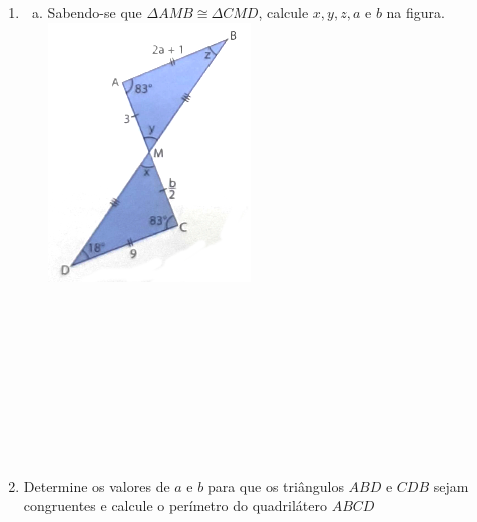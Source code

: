 \documentclass[a4paper,14pt]{article}
\begin{document}
\begin{multicols}{2}
\begin{enumerate}
			\item \begin{enumerate}[a)]
				\item Sabendo-se que $\Delta$$AMB \cong \Delta$$CMD$, calcule $x, y, z, a$ e $b$ na figura. \\
				\includegraphics[width=1.1\linewidth]{6FMA109_imagens/imagem5} \\\\\\\\\\\\\\\\\\\\
			\end{enumerate}
			\item Determine os valores de $a$ e $b$ para que os triângulos $ABD$ e $CDB$ sejam congruentes e calcule o perímetro do quadrilátero $ABCD$ \\

\end{enumerate}
\end{multicols}
\end{document}
